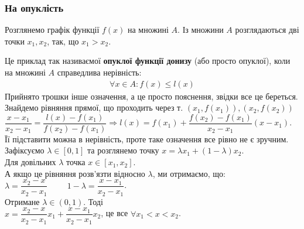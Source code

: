 \documentclass[a4paper, 14pt]{article}
\theoremstyle{theoremdd}
\theoremstyle{theoremdd}
\theoremstyle{theoremdd}
\theoremstyle{theoremdd}
\theoremstyle{theoremdd}
\theoremstyle{theoremdd}
\theoremstyle{theoremdd}
\theoremstyle{theoremdd}
\begin{document}
\subsubsection{На опуклість}
Розглянемо графік функції $f(x)$ на множині $A$. Із множини $A$ розглядаються дві точки $x_1,x_2$, так, що $x_1 > x_2$.
\begin{figure}[H]
\centering
{}
\end{figure}
Це приклад так називаємої \textbf{опуклої функції донизу} (або просто опуклої), коли на множині $A$ справедлива нерівність:
\begin{align*}
\forall x \in A: f(x) \leq l(x)
\end{align*}
Прийнято трошки інше означення, а це просто пояснення, звідки все це береться.\\
Знайдемо рівняння прямої, що проходить через т. $(x_1,f(x_1)), (x_2,f(x_2))$\\
$\dfrac{x-x_1}{x_2-x_1} = \dfrac{l(x)-f(x_1)}{f(x_2)-f(x_1)} \Rightarrow l(x) = f(x_1) + \dfrac{f(x_2)-f(x_1)}{x_2-x_1}(x-x_1)$.\\
Її підставити можна в нерівність, проте таке означення все рівно не є зручним.\\
Зафіксуємо $\lambda \in [0,1]$ та розглянемо точку $x = \lambda x_1 + (1-\lambda) x_2$.\\
Для довільних $\lambda$ точка $x \in [x_1,x_2]$. \\
А якщо це рівняння розв'язти відносно $\lambda$, ми отримаємо, що:\\
$\lambda = \dfrac{x_2-x}{x_2-x_1} \hspace{1cm} 1-\lambda = \dfrac{x-x_1}{x_2-x_1}$.\\
Отримане $\lambda \in (0,1)$. Тоді\\
$x = \dfrac{x_2-x}{x_2-x_1} x_1 + \dfrac{x-x_1}{x_2-x_1} x_2$, це все $\forall x_1 < x < x_2$.\\
\end{document}
